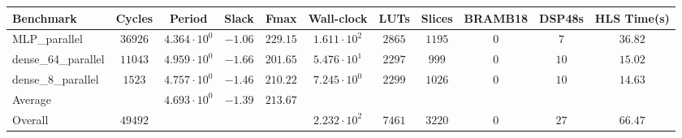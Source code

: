\begin{tabular}{|l|c|c|c|c|c|c|c|c|c|c|}
\hline
Benchmark           & Cycles    & Period                 & Slack     & Fmax       & Wall-clock             & LUTs     & Slices   & BRAMB18 & DSP48s & HLS Time(s) \\
\hline
MLP\_parallel       & $ 36926 $ & $ 4.364 \cdot 10^{0} $ & $ -1.06 $ & $ 229.15 $ & $ 1.611 \cdot 10^{2} $ & $ 2865 $ & $ 1195 $ & $ 0   $ & $ 7  $ & $ 36.82   $ \\
dense\_64\_parallel & $ 11043 $ & $ 4.959 \cdot 10^{0} $ & $ -1.66 $ & $ 201.65 $ & $ 5.476 \cdot 10^{1} $ & $ 2297 $ & $ 999  $ & $ 0   $ & $ 10 $ & $ 15.02   $ \\
dense\_8\_parallel  & $ 1523  $ & $ 4.757 \cdot 10^{0} $ & $ -1.46 $ & $ 210.22 $ & $ 7.245 \cdot 10^{0} $ & $ 2299 $ & $ 1026 $ & $ 0   $ & $ 10 $ & $ 14.63   $ \\
\hline
Average             & $       $ & $ 4.693 \cdot 10^{0} $ & $ -1.39 $ & $ 213.67 $ & $                    $ & $      $ & $      $ & $     $ & $    $ & $         $ \\
\hline
Overall             & $ 49492 $ & $                    $ & $       $ & $        $ & $ 2.232 \cdot 10^{2} $ & $ 7461 $ & $ 3220 $ & $ 0   $ & $ 27 $ & $ 66.47   $ \\
\hline
\end{tabular}
